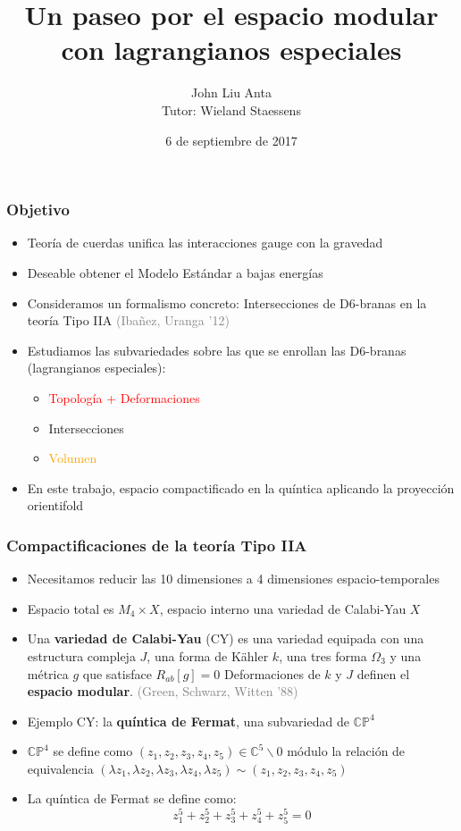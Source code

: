 \documentclass{beamer}
\begin{document}
\title{Un paseo por el espacio modular con lagrangianos especiales}  
\author{John Liu Anta\\
        Tutor: Wieland Staessens}
\date{6 de septiembre de 2017} 
\frame{\titlepage} 


\begin{frame}
  \frametitle{Objetivo}
  \begin{itemize}
    \item Teoría de cuerdas unifica las interacciones gauge con la gravedad
    \item Deseable obtener el Modelo Estándar a bajas energías
    \item Consideramos un formalismo concreto:
    Intersecciones de  D6-branas en la teoría Tipo IIA
    \textcolor{gray}{(Ibañez, Uranga '12)}
    \item Estudiamos las subvariedades sobre las que se enrollan las D6-branas (lagrangianos especiales):
      \begin{itemize}
        \item \textcolor{red}{Topología + Deformaciones}
        \item \textcolor{ao}{Intersecciones}
        \item \textcolor{orange}{Volumen}
      \end{itemize}
    \item En este trabajo, espacio compactificado en la quíntica aplicando la proyección orientifold
  \end{itemize}
\end{frame}

\begin{frame}
  \frametitle{Compactificaciones de la teoría Tipo IIA}
  \begin{itemize}
    \item Necesitamos reducir las 10 dimensiones a 4 dimensiones espacio-temporales
    \item Espacio total es $M_4\times X$, espacio interno una variedad de Calabi-Yau $X$
    \item Una \textbf{variedad de Calabi-Yau} (CY) es una variedad equipada con una estructura compleja $J$, una forma de Kähler $k$, una tres forma $\Omega_3$ y
      una métrica $g$ que satisface $R_{ab}[g]=0$
       Deformaciones de $k$ y $J$ definen el \textbf{espacio modular}.
       \textcolor{gray}{(Green, Schwarz, Witten '88)}
    \item Ejemplo CY: la \textbf{quíntica de Fermat}, una subvariedad de $\mathbb{CP}^4$
    \item $\mathbb{CP}^4$ se define como $(z_1,z_2,z_3,z_4,z_5)\in \mathbb{C}^5\backslash 0$ módulo la relación de equivalencia
      $(\lambda z_1,\lambda z_2,\lambda z_3,\lambda z_4,\lambda z_5)\sim (z_1,z_2,z_3,z_4,z_5)$
    \item La quíntica de Fermat se define como:
      \begin{equation*}
        z_1^5+z_2^5+z_3^5+z_4^5+z_5^5=0 
      \end{equation*}
  \end{itemize}
\end{frame}
\end{document}
